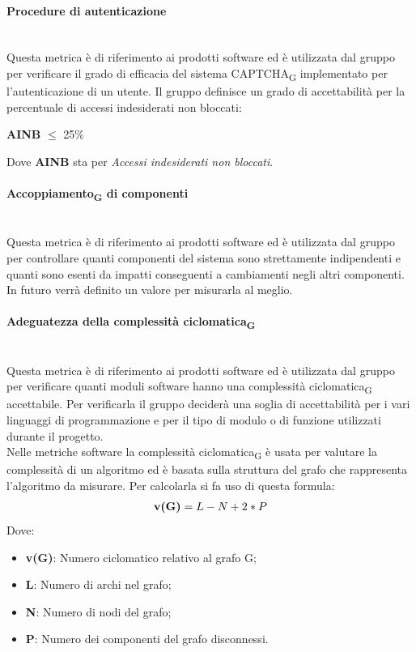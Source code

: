 \paragraph{Procedure di autenticazione}\mbox{}\\
Questa metrica è di riferimento ai prodotti software ed è utilizzata dal gruppo per verificare il grado di efficacia del sistema CAPTCHA\textsubscript{G} implementato per l'autenticazione di un utente. Il gruppo definisce un grado di accettabilità per la percentuale di accessi indesiderati non bloccati:
\begin{center}
	\textbf{AINB} $\le$ 25\%
\end{center}
Dove \textbf{AINB} sta per \textit{Accessi indesiderati non bloccati}.
\paragraph{Accoppiamento\textsubscript{G} di componenti}\mbox{}\\
Questa metrica è di riferimento ai prodotti software ed è utilizzata dal gruppo per controllare quanti componenti del sistema sono strettamente  indipendenti e quanti sono esenti da impatti conseguenti a cambiamenti negli altri componenti.
In futuro verrà definito un valore per misurarla al meglio. 
\paragraph{Adeguatezza della complessità ciclomatica\textsubscript{G}}\mbox{}\\
Questa metrica è di riferimento ai prodotti software ed è utilizzata dal gruppo per verificare quanti moduli software hanno una complessità ciclomatica\textsubscript{G} accettabile. Per verificarla il gruppo deciderà una soglia di accettabilità per i vari linguaggi di programmazione e per il tipo di modulo o di funzione utilizzati durante il progetto.\\
Nelle metriche software la complessità ciclomatica\textsubscript{G} è usata per valutare la complessità di un algoritmo ed è basata sulla struttura del grafo che rappresenta l’algoritmo da misurare. Per calcolarla si fa uso di questa formula:
\begin{align*}
	\centering
	\textbf{v(G)} = L - N + 2 * P
\end{align*}
Dove:
\begin{itemize}
	\item \textbf{v(G)}: Numero ciclomatico relativo al grafo G;
	\item \textbf{L}: Numero di archi nel grafo;
	\item \textbf{N}: Numero di nodi del grafo;
	\item \textbf{P}: Numero dei componenti del grafo disconnessi.
\end{itemize}

